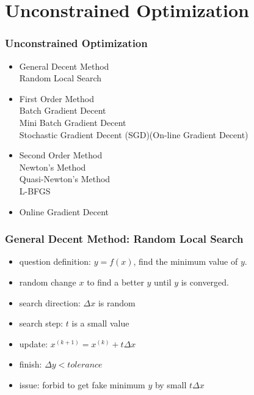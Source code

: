 
\ifx\allfiles\undefined

\fi
\section{Unconstrained Optimization}
\begin{frame}
\frametitle{Unconstrained Optimization}
	\small
	\begin{itemize}
		\item General Decent Method\\
				\hspace{1cm} Random Local Search
		\item First Order Method \\
				\hspace{1cm} Batch Gradient Decent \\
				\hspace{1cm} Mini Batch Gradient Decent\\
				\hspace{1cm} Stochastic Gradient Decent (SGD)(On-line Gradient Decent)\\
		\item Second Order Method\\
				\hspace{1cm} Newton's Method\\
				\hspace{1cm} Quasi-Newton's Method\\
				\hspace{2cm} L-BFGS\\
		\item Online Gradient Decent
	\end{itemize}
\end{frame}
\begin{frame}
\frametitle{General Decent Method: Random Local Search}
	\small
	\begin{itemize}
		\item question definition: $y=f(x)$, find the minimum value of $y$.  
		\item random change $x$ to find a better $y$ until $y$ is converged.
		\item search direction: $\Delta x$ is random
		\item search step: $t$ is a small value
		\item update: $x^{(k+1)}=x^{(k)}+t\Delta x$
		\item finish: $\Delta y < tolerance$
		\item issue: forbid to get fake minimum $y$ by small $t\Delta x$
	\end{itemize}
\end{frame}
